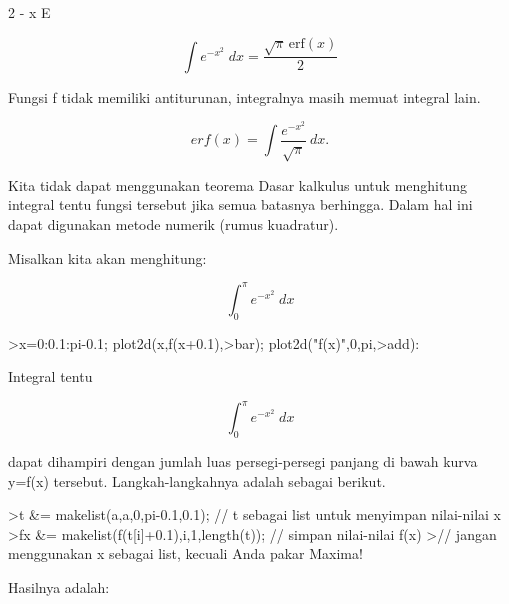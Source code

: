 \documentclass{article}
\begin{document}
\begin{eulernotebook}
\begin{eulercomment}
\begin{eulercomment}
\begin{eulercomment}
\begin{eulercomment}
\begin{euleroutput}
                                      2
                                   - x
                                  E
  
\end{euleroutput}
\begin{eulerformula}
\[
\int {e^ {- x^2 }}{\;dx}=\frac{\sqrt{\pi}\,\mathrm{erf}\left(x  \right)}{2}
\]
\end{eulerformula}
\begin{eulercomment}
Fungsi f tidak memiliki antiturunan, integralnya masih memuat integral
lain.

\end{eulercomment}
\begin{eulerformula}
\[
erf(x) = \int \frac{e^{-x^2}}{\sqrt{\pi}} \ dx.
\]
\end{eulerformula}
\begin{eulercomment}
Kita tidak dapat menggunakan teorema Dasar kalkulus untuk menghitung
integral tentu fungsi tersebut jika semua batasnya berhingga. Dalam
hal ini dapat digunakan metode numerik (rumus kuadratur).

Misalkan kita akan menghitung:

\end{eulercomment}
\begin{eulerformula}
\[
\int_{0}^{\pi}{e^ {- x^2 }\;dx}
\]
\end{eulerformula}
\begin{eulerprompt}
>x=0:0.1:pi-0.1; plot2d(x,f(x+0.1),>bar); plot2d("f(x)",0,pi,>add):
\end{eulerprompt}
\begin{eulercomment}
Integral tentu

\end{eulercomment}
\begin{eulerformula}
\[
\int_{0}^{\pi}{e^ {- x^2 }\;dx}
\]
\end{eulerformula}
\begin{eulercomment}
dapat dihampiri dengan jumlah luas persegi-persegi panjang di bawah
kurva y=f(x) tersebut. Langkah-langkahnya adalah sebagai berikut.
\end{eulercomment}
\begin{eulerprompt}
>t &= makelist(a,a,0,pi-0.1,0.1); // t sebagai list untuk menyimpan nilai-nilai x
>fx &= makelist(f(t[i]+0.1),i,1,length(t)); // simpan nilai-nilai f(x)
>// jangan menggunakan x sebagai list, kecuali Anda pakar Maxima!
\end{eulerprompt}
\begin{eulercomment}
Hasilnya adalah:


\end{eulercomment}
\end{eulercomment}
\end{eulercomment}
\end{eulercomment}
\end{eulercomment}
\end{eulernotebook}
\end{document}
